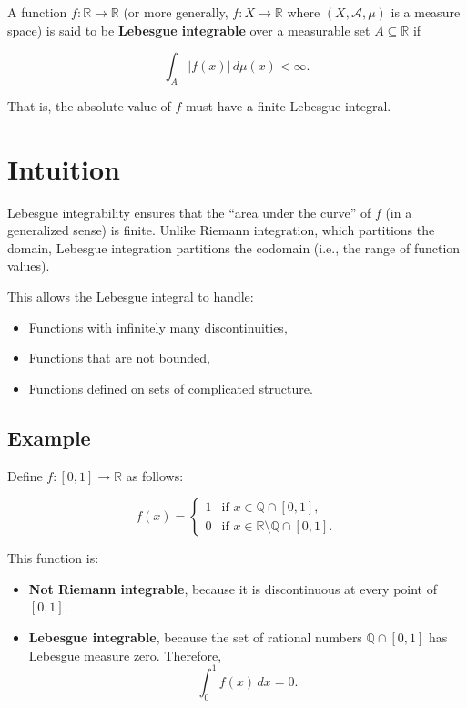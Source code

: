
A function \( f: \mathbb{R} \to \mathbb{R} \) (or more generally, \( f: X \to \mathbb{R} \) where \( (X, \mathcal{A}, \mu) \) is a measure space) is said to be \textbf{Lebesgue integrable} over a measurable set \( A \subseteq \mathbb{R} \) if

\[
\int_A |f(x)| \, d\mu(x) < \infty.
\]

That is, the absolute value of \( f \) must have a finite Lebesgue integral.

\section*{Intuition}

Lebesgue integrability ensures that the ``area under the curve'' of \( f \) (in a generalized sense) is finite. Unlike Riemann integration, which partitions the domain, Lebesgue integration partitions the codomain (i.e., the range of function values).

This allows the Lebesgue integral to handle:
\begin{itemize}
    \item Functions with infinitely many discontinuities,
    \item Functions that are not bounded,
    \item Functions defined on sets of complicated structure.
\end{itemize}

\subsection*{Example}

Define \( f: [0,1] \to \mathbb{R} \) as follows:

\[
f(x) =
\begin{cases}
1 & \text{if } x \in \mathbb{Q} \cap [0,1], \\
0 & \text{if } x \in \mathbb{R} \setminus \mathbb{Q} \cap [0,1].
\end{cases}
\]

This function is:
\begin{itemize}
    \item \textbf{Not Riemann integrable}, because it is discontinuous at every point of \([0,1]\).
    \item \textbf{Lebesgue integrable}, because the set of rational numbers \( \mathbb{Q} \cap [0,1] \) has Lebesgue measure zero. Therefore,
    \[
    \int_0^1 f(x) \, dx = 0.
    \]
\end{itemize}

